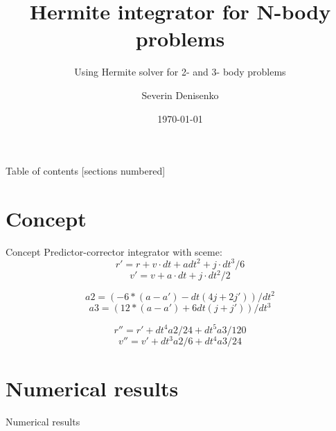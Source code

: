 \documentclass[10pt]{beamer}
\title{Hermite integrator for N-body problems}
\subtitle{Using Hermite solver for 2- and 3- body problems}
\date{\today}
\author{Severin Denisenko}
\institute{Saint Petersburg State University}
\begin{document}
\maketitle

\begin{frame}{Table of contents}
  [sections numbered]
  \tableofcontents%
\end{frame}

\section[Concept]{Concept}

\begin{frame}{Concept}
    Predictor-corrector integrator with sceme:
    \begin{equation*}
        r' = r + v \cdot dt + a dt^2 + j \cdot dt^3 / 6
    \end{equation*}
    \begin{equation*}
        v' = v + a \cdot dt + j \cdot dt^2 /2
    \end{equation*}

    \begin{equation*}
        a2 = (-6 * (a - a') - dt (4 j + 2 j')) / dt^2
    \end{equation*}
    \begin{equation*}
        a3 = (12 * (a - a') + 6 dt (j + j')) / dt^3
    \end{equation*}

    \begin{equation*}
        r'' = r' + dt^4 a2 / 24 + dt^5 a3 / 120
    \end{equation*}
    \begin{equation*}
        v'' = v' + dt^3 a2 / 6 + dt^4 a3 / 24
    \end{equation*}
\end{frame}

\section{Numerical results}

\begin{frame}{Numerical results}
  \begin{figure}
  \end{figure}
\end{frame}
\end{document}

